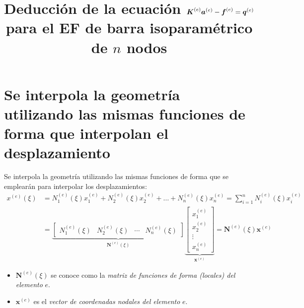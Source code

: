 \documentclass[12pt,letterpaper]{article}
\title{Deducción de la ecuación $\ma{K}^{(e)} \ve{a}^{(e)} - \ma{f}^{(e)} = \ma{q}^{(e)}$ para el EF de barra isoparamétrico de $n$ nodos}
\date{}
\newcommand{\ve}[1]{{\boldsymbol{#1}}}
\newcommand{\ma}[1]{{\boldsymbol{#1}}}
\begin{document}
\maketitle

\section{Se interpola la geometría utilizando las mismas funciones de forma que interpolan el desplazamiento}

Se interpola la geometría utilizando las mismas funciones de forma que se emplearán para interpolar los desplazamientos:
\begin{align}
x^{(e)}(\xi) 
&= N_1^{(e)}(\xi) x_1^{(e)} + N_2^{(e)}(\xi) x_2^{(e)} + \ldots + N_n^{(e)}(\xi) x_n^{(e)} 
= \sum_{i=1}^n N_i^{(e)}(\xi) x_i^{(e)} \\
&= 
\underbrace{\begin{bmatrix}
    N_1^{(e)}(\xi) & N_2^{(e)}(\xi) & \cdots & N_n^{(e)}(\xi)
    \end{bmatrix}}_{\ma{N}^{(e)}(\xi)}
\underbrace{\begin{bmatrix}
    x_1^{(e)} \\ x_2^{(e)} \\ \vdots \\ x_n^{(e)}
    \end{bmatrix}}_{\ma{x}^{(e)}} = \ma{N}^{(e)}(\xi)  \ve{x}^{(e)}
\end{align}

\begin{itemize}
    \item $\ma{N}^{(e)}(\xi)$ se conoce como la \emph{matriz de funciones de forma (locales) del elemento} $e$.
    \item $\ve{x}^{(e)}$ es el \emph{vector de coordenadas nodales del elemento} $e$.
\end{itemize}    
\end{document}
